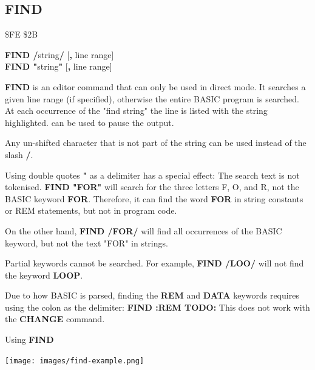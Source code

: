 \subsection{FIND}
\begin{description}[leftmargin=2cm,style=nextline]
\item [Token:] \$FE \$2B
\item [Format:] {\bf FIND /}string{\bf/} [{\bf,} line range] \\
		{\bf FIND "}string{\bf"} [{\bf,} line range]
\item [Usage:]  {\bf FIND} is an editor command that can only be used
                in direct mode. It searches a given line range
                (if specified), otherwise the entire BASIC program is searched.
                At each occurrence of the "find string" the line is
                listed with the string highlighted.
                 can be used to pause the output.

\item [Remarks:] Any un-shifted character that is not part of
                 the string can be used instead of the slash {\bf /}.

                 Using double quotes {\bf "} as a delimiter has a special effect:
                 The search text is not tokenised.
                 {\bf FIND "FOR"} will search for the three letters F, O, and R, not
                 the BASIC keyword {\bf FOR}. Therefore, it can find the word
                 {\bf FOR} in string constants or REM statements, but not
                 in program code.

                 On the other hand, {\bf FIND /FOR/} will find all occurrences of
                 the BASIC keyword, but not the text "FOR" in strings.

                 Partial keywords cannot be searched. For example,
                 {\bf FIND /LOO/} will not find the keyword {\bf LOOP}.

                 Due to how BASIC is parsed, finding the {\bf REM} and {\bf DATA}
                 keywords requires using the colon as the delimiter: {\bf FIND :REM TODO:}
                 This does not work with the {\bf CHANGE} command.


\item [Example:] Using {\bf FIND}
\item \begin{center}\texttt{[image: images/find-example.png]}\end{center}
\end{description}

